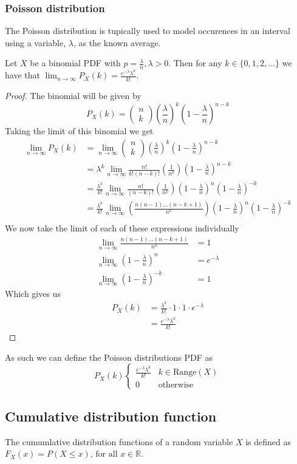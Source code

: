 \subsubsection{Poisson distribution}
The Poisson distribution is tupically used to model occurences in an interval using a variable, $\lambda$, as the known average.
\begin{theorem}
    Let $X$ be a binomial PDF with $p=\frac{\lambda}{n},\lambda>0$. Then for any $k\in\{0,1,2,\ldots\}$ we have that $\lim_{n\rightarrow\infty}P_{X}(k)=\frac{e^{-\lambda}\lambda^{k}}{k!}$.
\end{theorem}
\begin{proof}
  The binomial will be given by
  \[
    P_{X}(k)=\begin{pmatrix}n\\k\end{pmatrix}\left(\frac{\lambda}{n}\right)^{k}\left(1-\frac{\lambda}{n}\right)^{n-k}
  \]
  Taking the limit of this binomial we get
  \begin{align*}
      \lim_{n\rightarrow\infty}P_{X}(k)&=\lim_{n\rightarrow\infty}\begin{pmatrix}n\\k\end{pmatrix}\left(\frac{\lambda}{n}\right)^{k}\left(1-\frac{\lambda}{n}\right)^{n-k} \\
                        &=\lambda^{k}\lim_{n\rightarrow\infty}\frac{n!}{k!(n-k)!}\left(\frac{1}{n^{k}}\right)\left(1-\frac{\lambda}{n}\right)^{n-k} \\
                        &=\frac{\lambda^{k}}{k!}\lim_{n\rightarrow\infty}\frac{n!}{(n-k)!}\left(\frac{1}{n^{k}}\right)\left(1-\frac{\lambda}{n}\right)^{n}\left(1-\frac{\lambda}{n}\right)^{-k} \\
                        &=\frac{\lambda^{k}}{k!}\lim_{n\rightarrow\infty}\left(\frac{n(n-1)\ldots(n-k+1)}{n^{k}}\right)\left(1-\frac{\lambda}{n}\right)^{n}\left(1-\frac{\lambda}{n}\right)^{-k} \\
  \end{align*}
  We now take the limit of each of these expressions individually
  \begin{align*}
      \lim_{n\rightarrow\infty}\frac{n(n-1)\ldots(n-k+1)}{n^{k}}&=1 \\
      \lim_{n\rightarrow\infty}\left(1-\frac{\lambda}{n}\right)^{n}&=e^{-\lambda} \\
      \lim_{n\rightarrow\infty}\left(1-\frac{\lambda}{n}\right)^{-k}&=1 
  \end{align*}
  Which gives us
  \begin{align*}
      P_{X}(k)&=\frac{\lambda^{k}}{k!}\cdot 1\cdot 1\cdot e^{-\lambda} \\
              &=\frac{e^{-\lambda}\lambda^{k}}{k!}
  \end{align*}
\end{proof}
As such we can define the Poisson distributions PDF as
\[
    P_{X}(k)\begin{cases}\frac{e^{-\lambda}\lambda^{k}}{k!} & k\in \text{Range}(X) \\ 0 & \text{otherwise}\end{cases}
\]
\subsection{Cumulative distribution function}
\begin{definition}
  The cumumlative distribution functions of a random variable $X$ is defined as $F_{X}(x)=P(X\leq x)\text{, for all } x\in \mathbb{R}$.
\end{definition}
